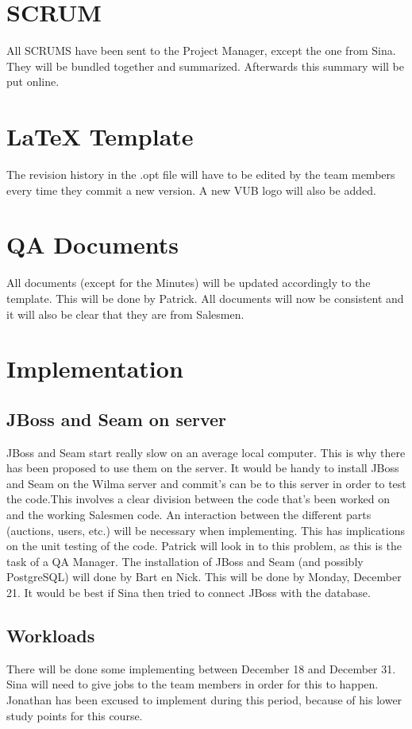 \documentclass[a4paper, 12pt]{article}
\begin{document}
	\section{SCRUM}
All SCRUMS have been sent to the Project Manager, except the one from Sina. They will be bundled together and summarized. Afterwards this summary will be put online.
 
	\section{\LaTeX{} Template}
The revision history in the .opt file will have to be edited by the team members every time they commit a new version. A new VUB logo will also be added.
	\section{QA Documents}
All documents (except for the Minutes) will be updated accordingly to the template. This will be done by Patrick. All documents will now be consistent and it will also be clear that they are from Salesmen. 
	\section{Implementation}
		\subsection{JBoss and Seam on server}
		JBoss and Seam start really slow on an average local computer. This is why there has been proposed to use them on the server. It would be handy to install JBoss and Seam on the Wilma server and commit's can be to this server in order to test the code.This involves a clear division between the code that's been worked on and the working Salesmen code. An interaction between the different parts (auctions, users, etc.) will be necessary when implementing. This has  implications on the unit testing of the code. Patrick will look in to this problem, as this is the task of a QA Manager. The installation of JBoss and Seam (and possibly PostgreSQL) will done by Bart en Nick. This will be done by Monday, December 21. It would be best if Sina then tried to connect JBoss with the database. 
		\subsection{Workloads}
There will be done some implementing between December 18 and December 31. Sina will need to give jobs to the team members in order for this to happen. Jonathan has been excused to implement during this period, because of his lower study points for this course.
\end{document}
